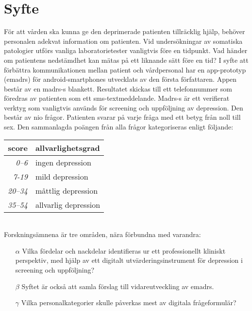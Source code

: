 \documentclass[12pt,a4paper,oneside]{article}
\let\oldcite\cite
\renewcommand*\cite[1]{\textsuperscript{\oldcite{#1}}}
\begin{document}
\section*{Syfte}
F{\"o}r att v{\aa}rden ska kunna ge den deprimerade patienten tillr{\"a}cklig hj{\"a}lp, beh{\"o}ver personalen adekvat information om patienten. Vid unders{\"o}kningar av somatiska patologier utf{\"o}rs vanliga laboratorietester vanligtvis f{\"o}re en tidpunkt. Vad h{\"a}nder om patientens nedst{\"a}mdhet kan m{\"a}tas p{\aa} ett liknande s{\"a}tt f{\"o}re en tid? I syfte att f{\"o}rb{\"a}ttra kommunikationen mellan patient och v{\aa}rdpersonal har en app-prototyp (e{\sc madrs}) f{\"o}r android-smartphones utvecklats av den f{\"o}rsta f{\"o}rfattaren\cite {emadrs1, emadrs2}. Appen best{\aa}r av en {\sc madrs-s} blankett. Resultatet skickas till ett telefonnummer som f{\"o}redras av patienten som ett {\sc sms}-textmeddelande. {\sc Madrs-s} {\"a}r ett verifierat verktyg som vanligtvis anv{\"a}nds f{\"o}r screening och uppf{\"o}ljning av depression\cite {madrs2, madrs3}. Den best{\aa}r av nio fr{\aa}gor. Patienten svarar p{\aa} varje fr{\aa}ga med ett betyg fr{\aa}n noll till sex. Den sammanlagda po{\"a}ngen fr{\aa}n alla fr{\aa}gor kategoriseras enligt f{\"o}ljande: \\

\begin{tabular}{r|l}
{\bf score} & {\bf allvarlighetsgrad} \\
\hline {\it 0--6} & ingen depression \\
{\it 7-19} & mild depression \\
{\it 20--34} & m{\aa}ttlig depression \\
{\it 35--54} & allvarlig depression \\\end{tabular}\vspace{1em}
\\Forsknings{\"a}mnena {\"a}r tre omr{\aa}den, n{\"a}ra f{\"o}rbundna med varandra:
\begin{itemize}
\item[$\alpha$] Vilka f{\"o}rdelar och nackdelar identifieras ur ett professionellt kliniskt perspektiv, med hj{\"a}lp av ett digitalt utv{\"a}rderingsinstrument f{\"o}r depression i screening och uppf{\"o}ljning?
\item[$\beta$] Syftet {\"a}r ocks{\aa} att samla f{\"o}rslag till vidareutveckling av e{\sc madrs}.
\item[$\gamma$] Vilka personalkategorier skulle p{\aa}verkas mest av digitala fr{\aa}geformul{\"a}r?
\end{itemize}
\end{document}
